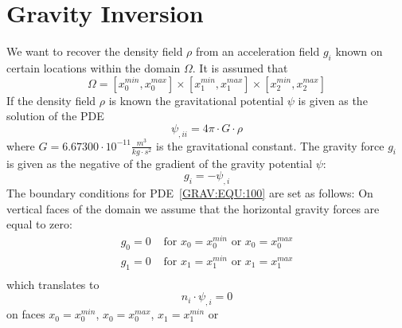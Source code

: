 
%
%
%

\section{Gravity Inversion}\label{sec:forward gravity}
We want to recover the density field $\rho$ from an acceleration field $g_i$ known on certain locations within the domain $\Omega$. It is
assumed that
\begin{equation}
\Omega = [x^{min}_0, x^{max}_0] \times
 [x^{min}_1, x^{max}_1] \times
 [x^{min}_2, x^{max}_2] 
\end{equation} 
If the density field $\rho$ is known the gravitational potential $\psi$ is given
as the solution of the PDE 
\begin{equation}\label{GRAV:EQU:100}
\psi_{,ii} = 4\pi \cdot G \cdot  \rho
\end{equation}
where $G=6.67300 \cdot 10^{-11}  \frac{m^3}{kg \cdot s^2}$ is the gravitational constant.  
The gravity force $g_i$ is given
as the negative of the gradient of the gravity potential $\psi$:
\begin{equation}\label{GRAV:EQU:101}
 g_i = - \psi_{,i} 
\end{equation} 
The boundary conditions for PDE~\ref{GRAV:EQU:100} are set as follows:
On vertical faces of the domain we assume that the horizontal gravity forces are equal to zero:
\begin{equation}\label{GRAV:EQU:101a}
\begin{array}{ll}
g_0=0 & \mbox{ for } x_0=x^{min}_0 \mbox{ or } x_0=x^{max}_0 \\
g_1=0 & \mbox{ for } x_1=x^{min}_1 \mbox{ or } x_1=x^{max}_1 \\
\end{array}
\end{equation}
which translates to
\begin{equation}\label{GRAV:EQU:101aa}
n_i \cdot  \psi_{,i} = 0
\end{equation} 
on faces $x_0=x^{min}_0$, 
$x_0=x^{max}_0$,
$x_1=x^{min}_1$ or 
